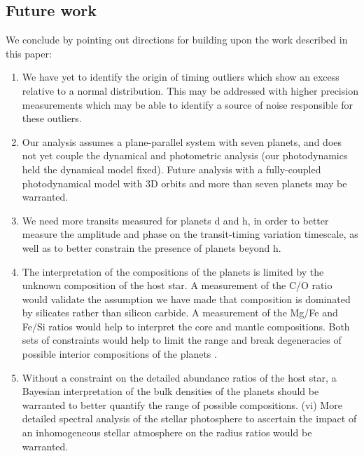\documentclass[twocolumn]{aastex63}
\begin{document}

\pagebreak
\subsection{Future work}

We conclude by pointing out directions for building upon the work described in this paper:
\begin{enumerate}
    \item We have yet to identify the origin of timing outliers which
    show an excess relative to a normal distribution.  This may be addressed
    with higher precision measurements which may be able to identify a source
    of noise responsible for these outliers.
    \item Our analysis assumes a plane-parallel system with seven planets, and
    does not yet couple the dynamical and photometric analysis (our photodynamics
    held the dynamical model fixed).  Future analysis with a fully-coupled
    photodynamical model with 3D orbits and more than seven planets may be warranted.
    \item We need more transits measured for planets d and h, in order
    to better measure the amplitude and phase on the transit-timing variation
    timescale, as well as to better constrain the presence of planets beyond h.
    \item The interpretation of the compositions of the planets is limited by the unknown composition of the host star. A measurement of the C/O ratio would validate the assumption we have made that composition is dominated by silicates rather than silicon carbide.  A measurement of the Mg/Fe and Fe/Si ratios would help to interpret the core and mantle compositions.  Both sets of constraints would help to limit the range and break degeneracies of possible interior compositions of the planets \citep{Dorn2015,Bitsch2019b}.
    \item Without a constraint on the detailed abundance ratios of the host star, a Bayesian interpretation of the bulk densities of the planets should be warranted \citep{Dorn2016} to better quantify the range of possible compositions.
    (vi) More detailed spectral analysis of the stellar photosphere to ascertain the impact of an inhomogeneous stellar atmosphere on the radius ratios would be warranted. 
\end{enumerate}
\end{document}
